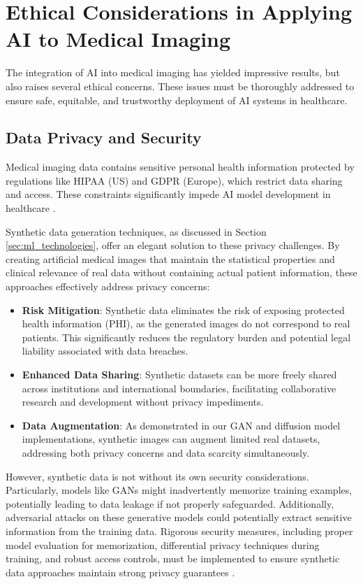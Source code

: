 \documentclass{article}
\begin{document}
\section{Ethical Considerations in Applying AI to Medical Imaging}
\label{sec:ethical_implications}
The integration of AI into medical imaging has yielded impressive results, but also raises several ethical concerns. These issues must be thoroughly addressed to ensure safe, equitable, and trustworthy deployment of AI systems in healthcare.


\subsection{Data Privacy and Security}
Medical imaging data contains sensitive personal health information protected by regulations like HIPAA (US) and GDPR (Europe), which restrict data sharing and access. These constraints significantly impede AI model development in healthcare \cite{koetzierGeneratingSyntheticData2024}.

Synthetic data generation techniques, as discussed in Section \ref{sec:ml_technologies}, offer an elegant solution to these privacy challenges. By creating artificial medical images that maintain the statistical properties and clinical relevance of real data without containing actual patient information, these approaches effectively address privacy concerns:

\begin{itemize}
    \item \textbf{Risk Mitigation}: Synthetic data eliminates the risk of exposing protected health information (PHI), as the generated images do not correspond to real patients. This significantly reduces the regulatory burden and potential legal liability associated with data breaches.
    
    \item \textbf{Enhanced Data Sharing}: Synthetic datasets can be more freely shared across institutions and international boundaries, facilitating collaborative research and development without privacy impediments.
    
    \item \textbf{Data Augmentation}: As demonstrated in our GAN and diffusion model implementations, synthetic images can augment limited real datasets, addressing both privacy concerns and data scarcity simultaneously.
\end{itemize}

However, synthetic data is not without its own security considerations. Particularly, models like GANs might inadvertently memorize training examples, potentially leading to data leakage if not properly safeguarded. Additionally, adversarial attacks on these generative models could potentially extract sensitive information from the training data. Rigorous security measures, including proper model evaluation for memorization, differential privacy techniques during training, and robust access controls, must be implemented to ensure synthetic data approaches maintain strong privacy guarantees \cite{koetzierGeneratingSyntheticData2024}.
\end{document}
